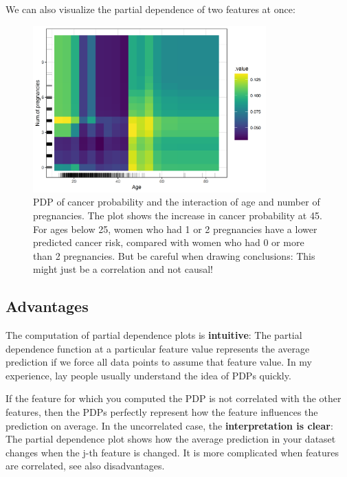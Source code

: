 \documentclass[
  10pt,
]{scrbook}
\begin{document}
We can also visualize the partial dependence of two features at once:

\begin{figure}

{\centering \includegraphics[width=0.8\textwidth]{images/pdp-cervical-2d-1} 

}

\caption{PDP of cancer probability and the interaction of age and number of pregnancies. The plot shows the increase in cancer probability at 45. For ages below 25, women who had 1 or 2 pregnancies have a lower predicted cancer risk, compared with women who had 0 or more than 2 pregnancies. But be careful when drawing conclusions: This might just be a correlation and not causal!}\label{fig:pdp-cervical-2d}
\end{figure}

\hypertarget{advantages-5}{%
\subsection{Advantages}\label{advantages-5}}

The computation of partial dependence plots is \textbf{intuitive}:
The partial dependence function at a particular feature value represents the average prediction if we force all data points to assume that feature value.
In my experience, lay people usually understand the idea of PDPs quickly.

If the feature for which you computed the PDP is not correlated with the other features, then the PDPs perfectly represent how the feature influences the prediction on average.
In the uncorrelated case, the \textbf{interpretation is clear}:
The partial dependence plot shows how the average prediction in your dataset changes when the j-th feature is changed.
It is more complicated when features are correlated, see also disadvantages.
\end{document}

